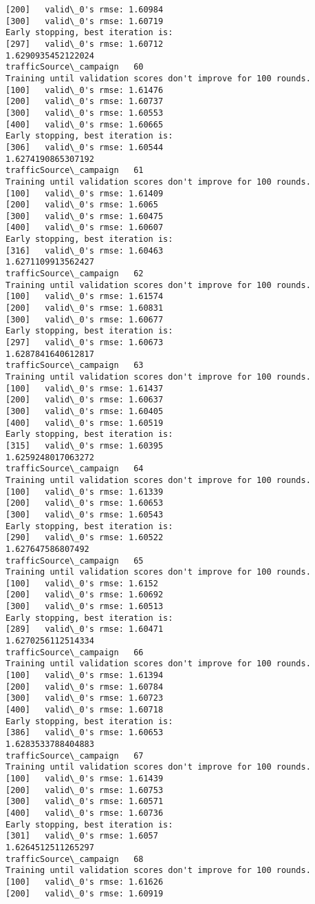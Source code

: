 \documentclass[11pt]{article}
\begin{document}
\begin{Verbatim}[commandchars=\\\{\}]
[200]	valid\_0's rmse: 1.60984
[300]	valid\_0's rmse: 1.60719
Early stopping, best iteration is:
[297]	valid\_0's rmse: 1.60712
1.6290935452122024
trafficSource\_campaign   60
Training until validation scores don't improve for 100 rounds.
[100]	valid\_0's rmse: 1.61476
[200]	valid\_0's rmse: 1.60737
[300]	valid\_0's rmse: 1.60553
[400]	valid\_0's rmse: 1.60665
Early stopping, best iteration is:
[306]	valid\_0's rmse: 1.60544
1.6274190865307192
trafficSource\_campaign   61
Training until validation scores don't improve for 100 rounds.
[100]	valid\_0's rmse: 1.61409
[200]	valid\_0's rmse: 1.6065
[300]	valid\_0's rmse: 1.60475
[400]	valid\_0's rmse: 1.60607
Early stopping, best iteration is:
[316]	valid\_0's rmse: 1.60463
1.6271109913562427
trafficSource\_campaign   62
Training until validation scores don't improve for 100 rounds.
[100]	valid\_0's rmse: 1.61574
[200]	valid\_0's rmse: 1.60831
[300]	valid\_0's rmse: 1.60677
Early stopping, best iteration is:
[297]	valid\_0's rmse: 1.60673
1.6287841640612817
trafficSource\_campaign   63
Training until validation scores don't improve for 100 rounds.
[100]	valid\_0's rmse: 1.61437
[200]	valid\_0's rmse: 1.60637
[300]	valid\_0's rmse: 1.60405
[400]	valid\_0's rmse: 1.60519
Early stopping, best iteration is:
[315]	valid\_0's rmse: 1.60395
1.6259248017063272
trafficSource\_campaign   64
Training until validation scores don't improve for 100 rounds.
[100]	valid\_0's rmse: 1.61339
[200]	valid\_0's rmse: 1.60653
[300]	valid\_0's rmse: 1.60543
Early stopping, best iteration is:
[290]	valid\_0's rmse: 1.60522
1.627647586807492
trafficSource\_campaign   65
Training until validation scores don't improve for 100 rounds.
[100]	valid\_0's rmse: 1.6152
[200]	valid\_0's rmse: 1.60692
[300]	valid\_0's rmse: 1.60513
Early stopping, best iteration is:
[289]	valid\_0's rmse: 1.60471
1.6270256112514334
trafficSource\_campaign   66
Training until validation scores don't improve for 100 rounds.
[100]	valid\_0's rmse: 1.61394
[200]	valid\_0's rmse: 1.60784
[300]	valid\_0's rmse: 1.60723
[400]	valid\_0's rmse: 1.60718
Early stopping, best iteration is:
[386]	valid\_0's rmse: 1.60653
1.6283533788404883
trafficSource\_campaign   67
Training until validation scores don't improve for 100 rounds.
[100]	valid\_0's rmse: 1.61439
[200]	valid\_0's rmse: 1.60753
[300]	valid\_0's rmse: 1.60571
[400]	valid\_0's rmse: 1.60736
Early stopping, best iteration is:
[301]	valid\_0's rmse: 1.6057
1.6264512511265297
trafficSource\_campaign   68
Training until validation scores don't improve for 100 rounds.
[100]	valid\_0's rmse: 1.61626
[200]	valid\_0's rmse: 1.60919

\end{Verbatim}
\end{document}
